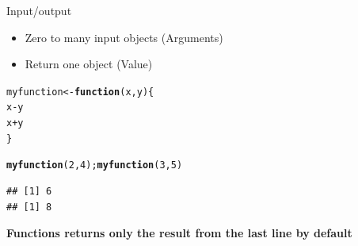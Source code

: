 \documentclass{beamer}\usepackage[]{graphicx}\usepackage[]{color}
\makeatletter
\newcommand{\hlnum}[1]{\textcolor[rgb]{0.686,0.059,0.569}{#1}}%
\newcommand{\hlopt}[1]{\textcolor[rgb]{0,0,0}{#1}}%
\newcommand{\hlstd}[1]{\textcolor[rgb]{0.345,0.345,0.345}{#1}}%
\newcommand{\hlkwa}[1]{\textcolor[rgb]{0.161,0.373,0.58}{\textbf{#1}}}%
\newcommand{\hlkwb}[1]{\textcolor[rgb]{0.69,0.353,0.396}{#1}}%
\newcommand{\hlkwc}[1]{\textcolor[rgb]{0.333,0.667,0.333}{#1}}%
\newcommand{\hlkwd}[1]{\textcolor[rgb]{0.737,0.353,0.396}{\textbf{#1}}}%
\newenvironment{kframe}{%
 \def\at@end@of@kframe{}%
 \ifinner\ifhmode%
  \def\at@end@of@kframe{\end{minipage}}%
  \begin{minipage}{\columnwidth}%
 \fi\fi%
 \def\FrameCommand##1{\hskip\@totalleftmargin \hskip-\fboxsep
 \colorbox{shadecolor}{##1}\hskip-\fboxsep
     \hskip-\linewidth \hskip-\@totalleftmargin \hskip\columnwidth}%
 \MakeFramed {\advance\hsize-\width
   \@totalleftmargin\z@ \linewidth\hsize
   \@setminipage}}%
 {\par\unskip\endMakeFramed%
 \at@end@of@kframe}
\newenvironment{knitrout}{}{} %
\makeatother
\begin{document}
\begin{frame}[fragile]{Input/output}

\begin{block}{}
  \begin{itemize}
  \item Zero to many input objects (Arguments)
  \item Return one object (Value)
  \end{itemize}
\end{block}

\begin{knitrout}
\color{fgcolor}\begin{kframe}
\begin{alltt}
\hlstd{myfunction} \hlkwb{<-} \hlkwa{function}\hlstd{(}\hlkwc{x}\hlstd{,} \hlkwc{y}\hlstd{)\{}
  \hlstd{x}\hlopt{-}\hlstd{y}
  \hlstd{x}\hlopt{+}\hlstd{y}
\hlstd{\}}

\hlkwd{myfunction}\hlstd{(}\hlnum{2}\hlstd{,} \hlnum{4}\hlstd{);} \hlkwd{myfunction}\hlstd{(}\hlnum{3}\hlstd{,} \hlnum{5}\hlstd{)}
\end{alltt}
\begin{verbatim}
## [1] 6
## [1] 8
\end{verbatim}
\end{kframe}
\end{knitrout}

\textbf{Functions returns only the result from the last line by default}
\end{frame}
\end{document}
